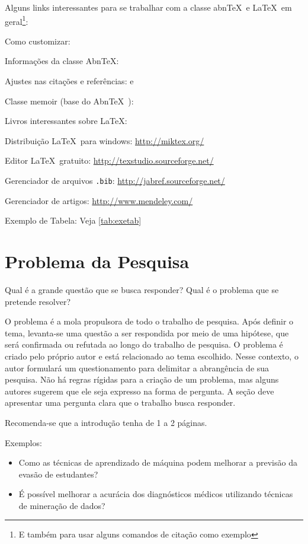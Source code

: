 \documentclass[
	12pt,				    %
	openright,			    %
	oneside,			    %
	a4paper,			    %
    sumario=tradicional,    %
	english,			    %
	brazil,				    %
	]{abntex2}
\let\citeonline\textcite
\let\cite\parencite
\begin{document}
Alguns links interessantes para se trabalhar com a classe abn\TeX\ e \LaTeX\ em geral\footnote{E também para usar alguns comandos de citação como exemplo}:
\begin{alineas}
  \item Como customizar: \citeonline{abntex2-wiki-como-customizar}
  \item Informações da classe Abn\TeX : \citeonline{abntex2classe}
  \item Ajustes nas citações e referências: \citeonline{abntex2cite} e \citeonline{abntex2cite-alf}
  \item Classe memoir (base do Abn\TeX\ ): 
  \item Livros interessantes sobre \LaTeX: \cite{Dongen2012,LeslieLamport90,FrankMittelbach111,Dongen2012}
  \item Distribuição \LaTeX\ para windows: \url{http://miktex.org/}
  \item Editor \LaTeX\ gratuito: \url{http://texstudio.sourceforge.net/}
  \item Gerenciador de arquivos \texttt{.bib}: \url{http://jabref.sourceforge.net/}
  \item Gerenciador de artigos: \url{http://www.mendeley.com/}
  \item Exemplo de Tabela: Veja \autoref{tab:exetab}
\end{alineas}

\section{Problema da Pesquisa}\label{sec:ProbPesq}

Qual é a grande questão que se busca responder? Qual é o problema que se pretende resolver? 

O problema é a mola propulsora de todo o trabalho de pesquisa. Após definir o tema, levanta-se uma questão a ser respondida por meio de uma hipótese, que será confirmada ou refutada ao longo do trabalho de pesquisa. O problema é criado pelo próprio autor e está relacionado ao tema escolhido. Nesse contexto, o autor formulará um questionamento para delimitar a abrangência de sua pesquisa. Não há regras rígidas para a criação de um problema, mas alguns autores sugerem que ele seja expresso na forma de pergunta. A seção deve apresentar uma pergunta clara que o trabalho busca responder. 

Recomenda-se que a introdução tenha de 1 a 2 páginas.

Exemplos:
\begin{itemize}
    \item Como as técnicas de aprendizado de máquina podem melhorar a previsão da evasão de estudantes?
    \item É possível melhorar a acurácia dos diagnósticos médicos utilizando técnicas de mineração de dados?
\end{itemize}
\end{document}
